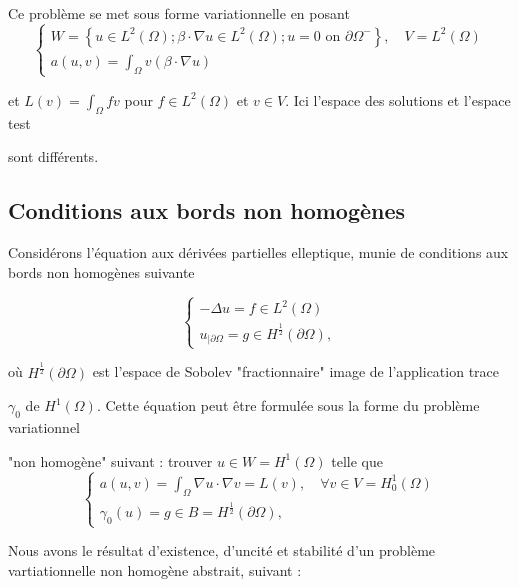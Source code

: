  Ce problème se met sous forme variationnelle en posant
$$
\left\{\begin{array}{l}
	W=\left\{u \in L^{2}(\Omega) ; \beta \cdot \nabla u \in L^{2}(\Omega) ; u=0 \text { on } \partial \Omega^{-}\right\}, \quad V=L^{2}(\Omega) \\
	a(u, v)=\int_{\Omega} v(\beta \cdot \nabla u)
\end{array}\right.
$$

et  $L(v)=\int_{\Omega} f v$ pour  $f \in L^{2}(\Omega) $ et $v\in V$. Ici l'espace des solutions et l'espace test 

sont différents.

\subsection{Conditions aux bords non homogènes}

Considérons l'équation aux dérivées partielles elleptique, munie de conditions aux bords non homogènes suivante

\begin{equation}
	\begin{cases}
		-\Delta u=f \in  L^{2}(\Omega)\\
		u_{\mid \partial \Omega}=g\in H^{\frac12}(\partial \Omega), 
	\end{cases}
\end{equation}

où $H^{\frac12}(\partial \Omega)$ est l'espace de Sobolev "fractionnaire"  image de l'application trace 

$\gamma_0$ de $H^{1}(\Omega)$.
Cette équation  peut être formulée sous la forme du  problème variationnel 

"non homogène" suivant : trouver $u\in W=H^{1}(\Omega)$ telle  que 
$$
\left\{\begin{array}{l}
	a(u, v)=\int_{\Omega} \nabla u \cdot \nabla v=L(v), \quad \forall v\in V= H_{0}^{1}(\Omega)\\
	\gamma_0(u)=g\in B=H^{\frac12}(\partial \Omega),
\end{array}\right.
$$

Nous avons le résultat d'existence, d'uncité et stabilité d'un problème vartiationnelle non homogène abstrait, suivant :

